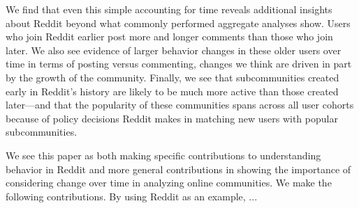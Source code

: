 We find that even this simple accounting for time reveals additional insights about Reddit beyond what commonly performed aggregate analyses show.  Users who join Reddit earlier post more and longer comments than those who join later.  We also see evidence of larger behavior changes in these older users over time in terms of posting versus commenting, changes we think are driven in part by the growth of the community.  Finally, we see that subcommunities created early in Reddit's history are likely to be much more active than those created later---and that the popularity of these communities spans across all user cohorts because of policy decisions Reddit makes in matching new users with popular subcommunities. 

We see this paper as both making specific contributions to understanding behavior in Reddit and more general contributions in showing the importance of considering change over time in analyzing online communities.  We make the following contributions. By using Reddit as an example, ...




